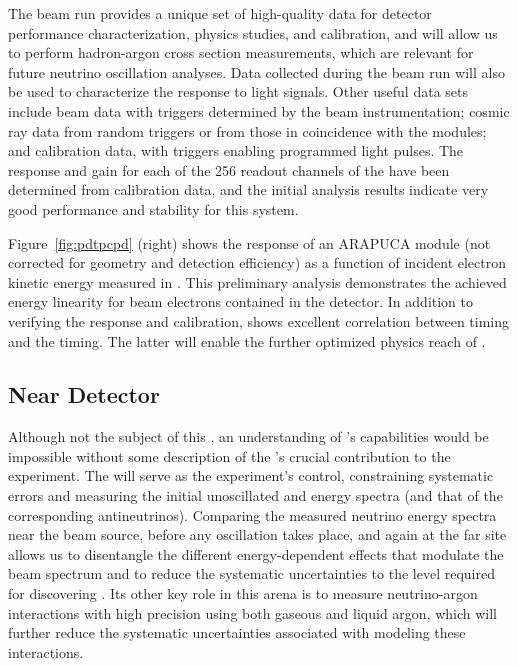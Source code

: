   The  beam run provides a unique set of high-quality data for detector performance characterization, physics studies, and calibration, and will 
allow us to perform hadron-argon cross section measurements, which are relevant for future  neutrino oscillation analyses.
Data collected during the beam run will also be used to characterize the  response to light signals. Other useful data sets include
beam data with triggers determined by the beam instrumentation; cosmic ray data  from random triggers or from those in coincidence with the  modules; and calibration data, with triggers enabling programmed light pulses. 
The %
response and gain for each of the 256 readout channels of the  have been determined from calibration data, and 
the initial analysis results indicate very good performance and stability for this system. 

Figure~\ref{fig:pdtpcpd} (right) shows the response of an %
ARAPUCA  module (not corrected for geometry and detection efficiency) as a function of incident electron kinetic energy measured in . 
 This preliminary analysis demonstrates the achieved energy linearity for beam electrons contained in the detector.  
In addition to verifying the  response and calibration,  shows excellent correlation between  timing and the  timing. The latter will enable the further optimized physics reach of . 

\subsection{Near Detector}
\label{sec:nd-verview}

Although not the subject of this , an understanding of 's capabilities would be impossible without 
some description of the  's crucial contribution  to the experiment.
The  will serve as the experiment's control,
 constraining systematic errors and measuring the initial unoscillated \numu and \nue energy spectra (and that of the corresponding antineutrinos). 
Comparing the measured neutrino energy spectra near the beam source, before any oscillation takes place, and again at the far site allows us to disentangle the different energy-dependent effects that modulate the beam spectrum and to reduce the systematic uncertainties to the level required for discovering . Its other key role in this arena is to measure neutrino-argon interactions with high precision using both gaseous and liquid argon, which will further reduce the systematic uncertainties associated with modeling these interactions. 

